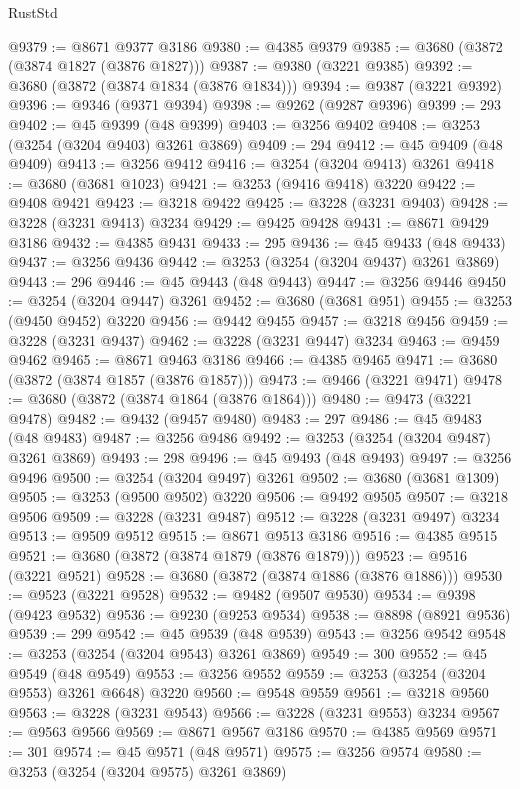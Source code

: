 \begin{lexlean}{RustStd}
\begin{coremodule}
@9379 := @8671 @9377 @3186
@9380 := @4385 @9379
@9385 := @3680 (@3872 (@3874 @1827 (@3876 @1827)))
@9387 := @9380 (@3221 @9385)
@9392 := @3680 (@3872 (@3874 @1834 (@3876 @1834)))
@9394 := @9387 (@3221 @9392)
@9396 := @9346 (@9371 @9394)
@9398 := @9262 (@9287 @9396)
@9399 := 293
@9402 := @45 @9399 (@48 @9399)
@9403 := @3256 @9402
@9408 := @3253 (@3254 (@3204 @9403) @3261 @3869)
@9409 := 294
@9412 := @45 @9409 (@48 @9409)
@9413 := @3256 @9412
@9416 := @3254 (@3204 @9413) @3261
@9418 := @3680 (@3681 @1023)
@9421 := @3253 (@9416 @9418) @3220
@9422 := @9408 @9421
@9423 := @3218 @9422
@9425 := @3228 (@3231 @9403)
@9428 := @3228 (@3231 @9413) @3234
@9429 := @9425 @9428
@9431 := @8671 @9429 @3186
@9432 := @4385 @9431
@9433 := 295
@9436 := @45 @9433 (@48 @9433)
@9437 := @3256 @9436
@9442 := @3253 (@3254 (@3204 @9437) @3261 @3869)
@9443 := 296
@9446 := @45 @9443 (@48 @9443)
@9447 := @3256 @9446
@9450 := @3254 (@3204 @9447) @3261
@9452 := @3680 (@3681 @951)
@9455 := @3253 (@9450 @9452) @3220
@9456 := @9442 @9455
@9457 := @3218 @9456
@9459 := @3228 (@3231 @9437)
@9462 := @3228 (@3231 @9447) @3234
@9463 := @9459 @9462
@9465 := @8671 @9463 @3186
@9466 := @4385 @9465
@9471 := @3680 (@3872 (@3874 @1857 (@3876 @1857)))
@9473 := @9466 (@3221 @9471)
@9478 := @3680 (@3872 (@3874 @1864 (@3876 @1864)))
@9480 := @9473 (@3221 @9478)
@9482 := @9432 (@9457 @9480)
@9483 := 297
@9486 := @45 @9483 (@48 @9483)
@9487 := @3256 @9486
@9492 := @3253 (@3254 (@3204 @9487) @3261 @3869)
@9493 := 298
@9496 := @45 @9493 (@48 @9493)
@9497 := @3256 @9496
@9500 := @3254 (@3204 @9497) @3261
@9502 := @3680 (@3681 @1309)
@9505 := @3253 (@9500 @9502) @3220
@9506 := @9492 @9505
@9507 := @3218 @9506
@9509 := @3228 (@3231 @9487)
@9512 := @3228 (@3231 @9497) @3234
@9513 := @9509 @9512
@9515 := @8671 @9513 @3186
@9516 := @4385 @9515
@9521 := @3680 (@3872 (@3874 @1879 (@3876 @1879)))
@9523 := @9516 (@3221 @9521)
@9528 := @3680 (@3872 (@3874 @1886 (@3876 @1886)))
@9530 := @9523 (@3221 @9528)
@9532 := @9482 (@9507 @9530)
@9534 := @9398 (@9423 @9532)
@9536 := @9230 (@9253 @9534)
@9538 := @8898 (@8921 @9536)
@9539 := 299
@9542 := @45 @9539 (@48 @9539)
@9543 := @3256 @9542
@9548 := @3253 (@3254 (@3204 @9543) @3261 @3869)
@9549 := 300
@9552 := @45 @9549 (@48 @9549)
@9553 := @3256 @9552
@9559 := @3253 (@3254 (@3204 @9553) @3261 @6648) @3220
@9560 := @9548 @9559
@9561 := @3218 @9560
@9563 := @3228 (@3231 @9543)
@9566 := @3228 (@3231 @9553) @3234
@9567 := @9563 @9566
@9569 := @8671 @9567 @3186
@9570 := @4385 @9569
@9571 := 301
@9574 := @45 @9571 (@48 @9571)
@9575 := @3256 @9574
@9580 := @3253 (@3254 (@3204 @9575) @3261 @3869)

\end{coremodule}
\end{lexlean}

